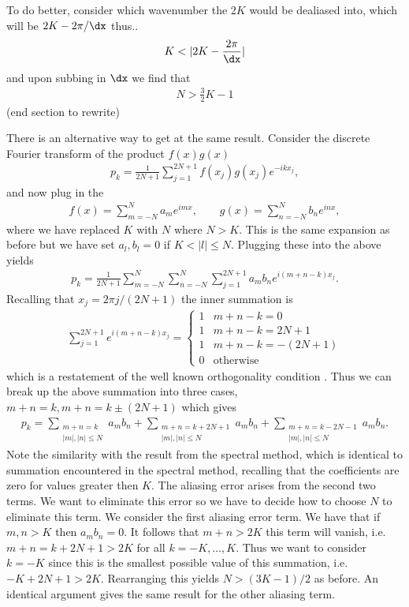 To do better, consider which wavenumber the $2K$ would be dealiased into, which will be $2K-2\pi/\dx$ thus..  
\begin{align}
K<|2K- \frac{2\pi}{\dx}|
\end{align}
and upon subbing in $\dx$ we find that 
\begin{align}
N > \frac{3}{2}K - 1
\end{align}
(end section to rewrite)

There is an alternative way to get at the same result. Consider the discrete Fourier transform of the product $f(x)g(x)$
\begin{align}
p_{k} = \frac{1}{2N+1}\sum_{j=1}^{2N+1}f(x_{j})g(x_{j})e^{-ikx_{j}},
\end{align}
and now plug in the 
\begin{align}
f(x) = \sum_{m=-N}^{N}a_{m}e^{imx}, \qquad g(x) = \sum_{n=-N}^{N}b_{n}e^{inx},
\end{align}
where we have replaced $K$ with $N$ where $N>K$. This is the same expansion as before but we have set $a_{l},b_{l}=0$ if $K < |l|\le N$. Plugging these into the above yields
\begin{align}
p_{k} = \frac{1}{2N+1}\sum_{m=-N}^{N}\sum_{n=-N}^{N}\sum_{j=1}^{2N+1}a_{m}b_{n}e^{i(m+n-k)x_{j}}.
\end{align}
Recalling that $x_{j} = 2\pi j/(2N+1)$ the inner summation is
\begin{align}
\sum_{j=1}^{2N+1}e^{i(m+n-k)x_{j}} =  \begin{cases}
1 & m+n-k =0\\
1 & m+n-k =2N+1\\
1 & m+n-k =-(2N+1)\\
0 & \text{otherwise}
\end{cases}
\end{align}
which is a restatement of the well known orthogonality condition \cite{durran}. Thus we can break up the above summation into three cases, $m+n=k, m+n=k\pm(2N+1)$ which gives
\begin{align}
p_{k} = \sum_{\substack{m+n=k\\ |m|,|n|\le N}}a_{m}b_{n}+  \sum_{\substack{m+n=k+2N+1\\ |m|,|n|\le N}}a_{m}b_{n}+ \sum_{\substack{m+n=k-2N-1\\ |m|,|n|\le N}}a_{m}b_{n}.
\end{align}
Note the similarity with the result from the spectral method, which is identical to summation encountered in the spectral method, recalling that the coefficients are zero for values greater then $K$. The aliasing error arises from the second two terms. We want to eliminate this error so we have to decide how to choose $N$ to eliminate this term. We consider the first aliasing error term. We have that if $m,n>K$ then $a_{m}b_{n}=0$. It follows that $m+n>2K$ this term will vanish, i.e. $m+n=k+2N+1>2K$ for all $k=-K,\ldots,K$. Thus we want to consider $k=-K$ since this is the smallest possible value of this summation, i.e. $-K+2N+1>2K$. Rearranging this yields $N>(3K-1)/2$ as before. An identical argument gives the same result for the other aliasing term. 

